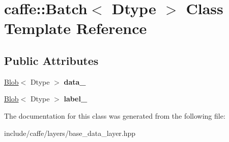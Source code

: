 \hypertarget{classcaffe_1_1Batch}{}\section{caffe\+:\+:Batch$<$ Dtype $>$ Class Template Reference}
\label{classcaffe_1_1Batch}
\subsection*{Public Attributes}
\begin{DoxyCompactItemize}
\item 
\hyperlink{classcaffe_1_1Blob}{Blob}$<$ Dtype $>$ {\bfseries data\+\_\+}\hypertarget{classcaffe_1_1Batch_aba928d78692d7bb97fe55578cee19c5b}{}\label{classcaffe_1_1Batch_aba928d78692d7bb97fe55578cee19c5b}

\item 
\hyperlink{classcaffe_1_1Blob}{Blob}$<$ Dtype $>$ {\bfseries label\+\_\+}\hypertarget{classcaffe_1_1Batch_ad9cb6471af708d5607521a81019f93a1}{}\label{classcaffe_1_1Batch_ad9cb6471af708d5607521a81019f93a1}

\end{DoxyCompactItemize}


The documentation for this class was generated from the following file\+:\begin{DoxyCompactItemize}
\item 
include/caffe/layers/base\+\_\+data\+\_\+layer.\+hpp\end{DoxyCompactItemize}
